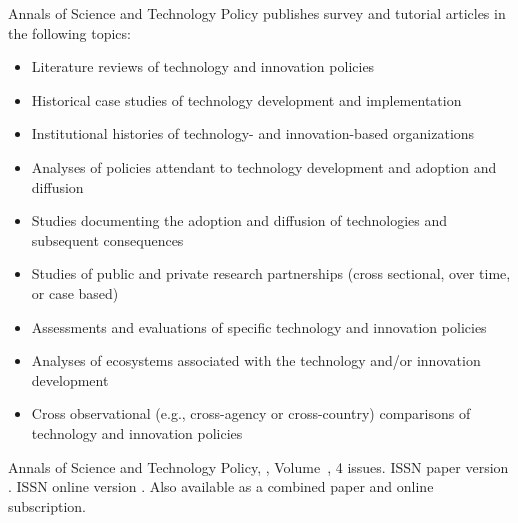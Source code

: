 


\journalaimsandscope
 {%
  Annals of Science and Technology Policy publishes
 survey and tutorial articles in the following topics:
 \begin{itemize}
\item{Literature reviews of technology and innovation policies}
\item{Historical case studies of technology development and implementation}
\item{Institutional histories of technology- and innovation-based organizations}
\item{Analyses of policies attendant to technology development and adoption and diffusion}
\item{Studies documenting the adoption and diffusion of technologies and subsequent consequences}
\item{Studies of public and private research partnerships (cross sectional, over time, or case based)}
\item{Assessments and evaluations of specific technology and innovation policies}
\item{Analyses of ecosystems associated with the technology and/or innovation development}
\item{Cross observational (e.g., cross-agency or cross-country) comparisons of technology and innovation policies}
\end{itemize}
 }


\journallibraryinfo
 {%
  Annals of Science and Technology Policy, ,
  Volume~, 4 issues.
  ISSN paper version .
  ISSN online version .
  Also available as a combined paper and online
  subscription.
 } 